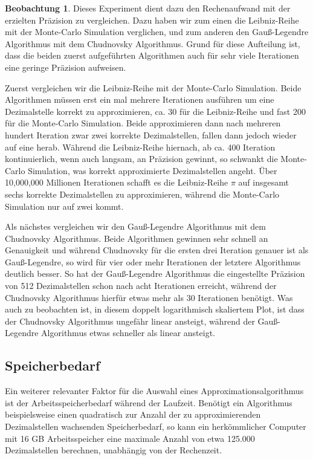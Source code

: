 \documentclass{scrartcl}
\theoremstyle{definition}
\newtheorem{approximation sequence}{Annäherungsfolge}
\newtheorem{observation}{Beobachtung}
\begin{document}
\begin{observation}
    Dieses Experiment dient dazu den Rechenaufwand mit der erzielten Präzision zu vergleichen. Dazu haben wir zum einen die Leibniz-Reihe mit 
    der Monte-Carlo Simulation verglichen, und zum anderen den Gauß-Legendre Algorithmus mit dem Chudnovsky Algorithmus.
    Grund für diese Aufteilung ist, dass die beiden zuerst aufgeführten Algorithmen auch für sehr viele Iterationen eine geringe Präzision aufweisen.
    
    Zuerst vergleichen wir die Leibniz-Reihe mit der Monte-Carlo Simulation. Beide Algorithmen müssen erst ein mal mehrere Iterationen ausführen um eine
    Dezimalstelle korrekt zu approximieren, ca. 30 für die Leibniz-Reihe und fast 200 für die Monte-Carlo Simulation. Beide approximieren dann nach mehreren 
    hundert Iteration zwar zwei korrekte Dezimalstellen, fallen dann jedoch wieder auf eine herab.
    Während die Leibniz-Reihe hiernach, ab ca. 400 Iteration kontinuierlich, wenn auch langsam, an Präzision gewinnt, so schwankt die Monte-Carlo Simulation, was korrekt approximierte 
    Dezimalstellen angeht.
    Über 10,000,000 Millionen Iterationen schafft es die Leibniz-Reihe \(\pi\) auf insgesamt sechs korrekte Dezimalstellen zu approximieren, während die Monte-Carlo Simulation nur auf zwei kommt.
    
    Als nächstes vergleichen wir den Gauß-Legendre Algorithmus mit dem Chudnovsky Algorithmus. Beide Algorithmen gewinnen sehr schnell an Genauigkeit und während Chudnovsky für die ersten drei
    Iteration genauer ist als Gauß-Legendre, so wird für vier oder mehr Iterationen der letztere Algorithmus deutlich besser. So hat der Gauß-Legendre Algorithmus die eingestellte Präzision von 512 Dezimalstellen schon nach
    acht Iterationen erreicht, während der Chudnovsky Algorithmus hierfür etwas mehr als 30 Iterationen benötigt. Was auch zu beobachten ist, in diesem doppelt logarithmisch skaliertem Plot, ist dass der Chudnovsky Algorithmus
    ungefähr linear ansteigt, während der Gauß-Legendre Algorithmus etwas schneller als linear ansteigt.
\end{observation}

\subsection{Speicherbedarf}

Ein weiterer relevanter Faktor für die Auswahl eines Approximationsalgorithmus
ist der Arbeitsspeicherbedarf während der Laufzeit. Benötigt ein Algorithmus
beispielsweise einen quadratisch zur Anzahl der zu approximierenden
Dezimalstellen wachsenden Speicherbedarf, so kann ein herkömmlicher Computer
mit 16 GB Arbeitsspeicher eine maximale Anzahl von etwa 125.000 Dezimalstellen
berechnen, unabhängig von der Rechenzeit.
\end{document}
